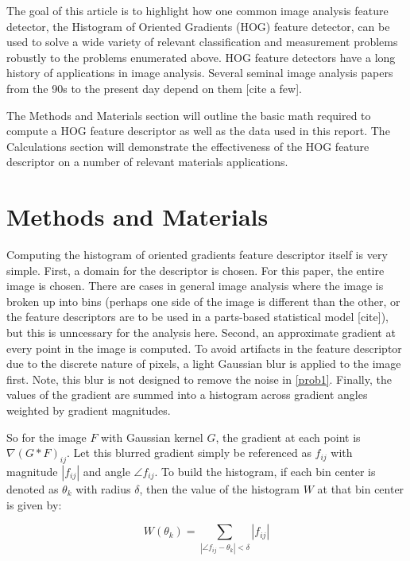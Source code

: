 \documentclass[review]{elsarticle}
\begin{document}
	The goal of this article is to highlight how one common image analysis feature detector, the Histogram of Oriented Gradients (HOG) feature detector, can be used to solve a wide variety of relevant classification and measurement problems robustly to the problems enumerated above. HOG feature detectors have a long history of applications in image analysis. Several seminal image analysis papers from the 90s to the present day depend on them [cite a few].

	The Methods and Materials section will outline the basic math required to compute a HOG feature descriptor as well as the data used in this report. The Calculations section will demonstrate the effectiveness of the HOG feature descriptor on a number of relevant materials applications.

	\section{Methods and Materials}
	Computing the histogram of oriented gradients feature descriptor itself is very simple. First, a domain for the descriptor is chosen. For this paper, the entire image is chosen. There are cases in general image analysis where the image is broken up into bins (perhaps one side of the image is different than the other, or the feature descriptors are to be used in a parts-based statistical model [cite]), but this is unncessary for the analysis here. Second, an approximate gradient at every point in the image is computed. To avoid artifacts in the feature descriptor due to the discrete nature of pixels, a light Gaussian blur is applied to the image first. Note, this blur is not designed to remove the noise in \ref{prob1}. Finally, the values of the gradient are summed into a histogram across gradient angles weighted by gradient magnitudes.

	So for the image $F$ with Gaussian kernel $G$, the gradient at each point is $\nabla \left( G \ast F \right)_{ij}$. Let this blurred gradient simply be referenced as $f_{ij}$ with magnitude $\left| f_{ij} \right|$ and angle $\angle f_{ij}$. To build the histogram, if each bin center is denoted as $\theta_k$ with radius $\delta$, then the value of the histogram $W$ at that bin center is given by:
	
	\begin{equation}
		W \left( \theta_k \right) = \sum_{\left| \angle f_{ij} - \theta_k \right| < \delta} \left| f_{ij} \right|
	\end{equation}
\end{document}
